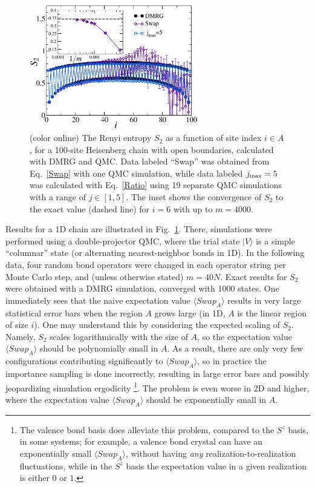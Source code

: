 \documentclass[prl,aps,twocolumn,floatfix,amsmath,amssymb,superscriptaddress,tightenlines]{revtex4}
\begin{document}
\begin{figure} {
\includegraphics[width=2.9in]{L100_fig2.eps} \caption{(color online) 
\label{1Dfig}
The Renyi entropy $S_2$ as a function of site index $i \in A$, for a 100-site Heisenberg chain with open boundaries, 
calculated with DMRG and QMC.  Data labeled ``Swap'' was obtained from Eq.~\eqref{Swap} with one QMC simulation, while
data labeled $j_{\rm max}=5$ was calculated with Eq.~\eqref{Ratio} using 19 separate QMC simulations with a range of  $j \in [1,5]$.  The inset shows the convergence of $S_2$ to the exact value (dashed line) for $i=6$ with up to $m=4000$.
}
} \end{figure}

Results for a 1D chain are illustrated in Fig.~\ref{1Dfig}.  There, simulations were performed using a double-projector QMC,  where
the trial state $| V \rangle$ is a simple ``columnar'' state (or alternating nearest-neighbor bonds in 1D).  In the following data, four random bond operators were changed in each operator string per Monte Carlo step, and (unless otherwise
stated) $m=40N$.  Exact results for $S_2$ were obtained with a DMRG simulation, converged with 1000 states.  
One 
immediately sees that the naive expectation value $\langle Swap_A \rangle$ 
results in very large statistical error bars 
when the region
$A$ grows large (in 1D, $A$ is the linear region of size $i$).  
One may understand this by considering the expected scaling of $S_2$.  Namely,
$S_2$ scales logarithmically with the size of $A$, so the expectation value
$\langle Swap_A \rangle$ should be polynomially small in $A$.  As a result, there
are only very
few configurations contributing significantly to $\langle Swap_A \rangle$, so in practice the importance sampling is done incorrectly,
resulting in large error bars and possibly jeopardizing simulation ergodicity \footnote{The valence bond basis does alleviate this problem, compared to the
$S^z$ basis, in some systems; for example, a valence
bond crystal can have an exponentially small $\langle Swap_A \rangle$, without having {\it any} realization-to-realization fluctuations,
while in the $S^z$ basis the expectation value  in a given realization is either $0$ or $1$.}.
The problem is even worse in 2D and higher, where the expectation value 
$\langle Swap_A \rangle$ should be exponentially small in $A$.
\end{document}
